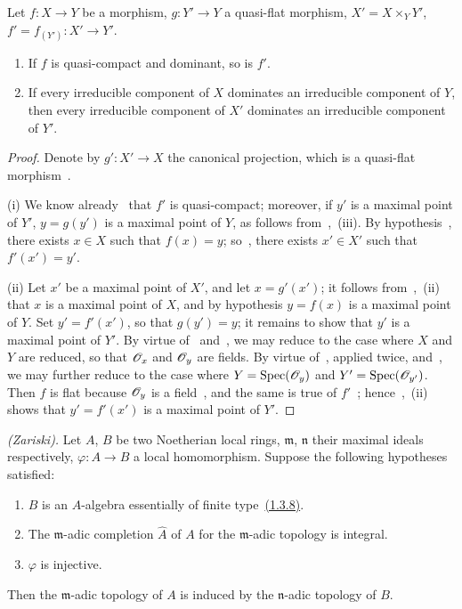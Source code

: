 \begin{proposition}[2.3.7]
\label{IV.2.3.7}
Let $f:X\to Y$ be a morphism, $g:Y'\to Y$ a quasi-flat morphism, $X'=X\times_Y Y'$, $f'=f_{(Y')}:X'\to Y'$.
\begin{enumerate}
  \item[(i)] If $f$ is quasi-compact and dominant, so is $f'$.
  \item[(ii)] If every irreducible component of $X$ dominates an irreducible component of $Y$, then every irreducible component of $X'$ dominates an irreducible component of $Y'$.
\end{enumerate}
\end{proposition}

\begin{proof}
Denote by $g':X'\to X$ the canonical projection, which is a quasi-flat morphism~.

(i) We know already~ that $f'$ is quasi-compact; moreover, if $y'$ is a maximal point of $Y'$, $y=g(y')$ is a maximal point of $Y$, as follows from~,~(iii).
By hypothesis~, there exists $x\in X$ such that $f(x)=y$; so~, there exists $x'\in X'$ such that $f'(x')=y'$.

(ii) Let $x'$ be a maximal point of $X'$, and let $x=g'(x')$; it follows from~,~(ii) that $x$ is a maximal point of $X$, and by hypothesis $y=f(x)$ is a maximal point of $Y$.
Set $y'=f'(x')$, so that $g(y')=y$; it remains to show that $y'$ is a maximal point of $Y'$.
By virtue of~ and~, we may reduce to the case where $X$ and $Y$ are reduced, so that $\mathscr{O}_x$ and $\mathscr{O}_y$ are fields.
By virtue of~, applied twice, and~, we may further reduce to the case where $Y=\operatorname{Spec}(\mathscr{O}_y)$ and $Y'=\operatorname{Spec}(\mathscr{O}_{y'})$.
Then $f$ is flat because $\mathscr{O}_y$ is a field~, and the same is true of $f'$~; hence~,~(ii) shows that $y'=f'(x')$ is a maximal point of $Y'$.
\end{proof}

\begin{corollary}[2.3.8]
\label{IV.2.3.8}
\emph{(Zariski).}
Let $A$, $B$ be two Noetherian local rings, $\mathfrak{m}$, $\mathfrak{n}$ their maximal ideals respectively, $\varphi:A\to B$ a local homomorphism. Suppose the following hypotheses satisfied:
\begin{enumerate}
  \item[$1^\circ$] $B$ is an $A$-algebra essentially of finite type~{\hyperref[IV.1.3.8]{(1.3.8)}}.
  \item[$2^\circ$] The $\mathfrak{m}$-adic completion $\widehat{A}$ of $A$ for the $\mathfrak{m}$-adic topology is integral.
  \item[$3^\circ$] $\varphi$ is injective.
\end{enumerate}
Then the $\mathfrak{m}$-adic topology of $A$ is induced by the $\mathfrak{n}$-adic topology of $B$.
\end{corollary}

